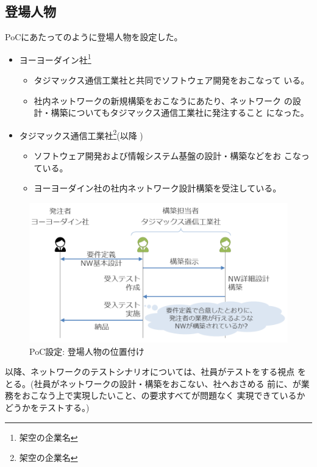   \subsection{登場人物}

PoCにあたってのように登場人物を設定した。
\begin{itemize}
 \item ヨーヨーダイン社\footnote{架空の企業名}
       \begin{itemize}
        \item タジマックス通信工業社と共同でソフトウェア開発をおこなって
              いる。
        \item 社内ネットワークの新規構築をおこなうにあたり、ネットワーク
              の設計・構築についてもタジマックス通信工業社に発注すること
              になった。
       \end{itemize}
 \item タジマックス通信工業社\footnote{架空の企業名}(以降 \tj )
       \begin{itemize}
        \item ソフトウェア開発および情報システム基盤の設計・構築などをお
              こなっている。
        \item ヨーヨーダイン社の社内ネットワーク設計構築を受注している。
       \end{itemize}
\end{itemize}

\begin{figure}[h]
 \centering
 \includegraphics[scale=0.6]{img/poc-situation.png}
 \caption{PoC設定: 登場人物の位置付け}
 \label{fig:poc-situation}
\end{figure}

以降、ネットワークのテストシナリオについては、\tj 社員がテストをする視点
をとる。(\tj 社員がネットワークの設計・構築をおこない、\yo 社へおさめる
前に、\yo が業務をおこなう上で実現したいこと、\yo の要求すべてが問題なく
実現できているかどうかをテストする。)

